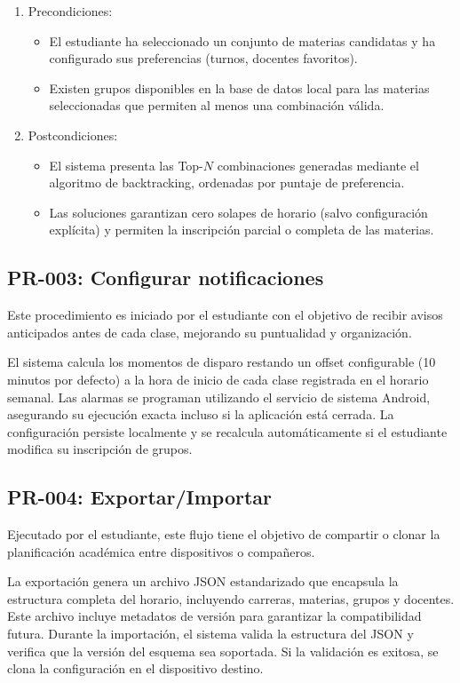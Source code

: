 \begin{enumerate}
  \item Precondiciones:
  \begin{itemize}
    \item El estudiante ha seleccionado un conjunto de materias candidatas y ha configurado sus preferencias (turnos, docentes favoritos).
    \item Existen grupos disponibles en la base de datos local para las materias seleccionadas que permiten al menos una combinación válida.
  \end{itemize}
  \item Postcondiciones:
  \begin{itemize}
    \item El sistema presenta las Top-$N$ combinaciones generadas mediante el algoritmo de backtracking, ordenadas por puntaje de preferencia.
    \item Las soluciones garantizan cero solapes de horario (salvo configuración explícita) y permiten la inscripción parcial o completa de las materias.
  \end{itemize}
\end{enumerate}

\subsection{PR-003: Configurar notificaciones}
Este procedimiento es iniciado por el estudiante con el objetivo de recibir avisos anticipados antes de cada clase, mejorando su puntualidad y organización.

El sistema calcula los momentos de disparo restando un offset configurable (10 minutos por defecto) a la hora de inicio de cada clase registrada en el horario semanal. Las alarmas se programan utilizando el servicio de sistema Android, asegurando su ejecución exacta incluso si la aplicación está cerrada. La configuración persiste localmente y se recalcula automáticamente si el estudiante modifica su inscripción de grupos.

\subsection{PR-004: Exportar/Importar}
Ejecutado por el estudiante, este flujo tiene el objetivo de compartir o clonar la planificación académica entre dispositivos o compañeros.

La exportación genera un archivo JSON estandarizado que encapsula la estructura completa del horario, incluyendo carreras, materias, grupos y docentes. Este archivo incluye metadatos de versión para garantizar la compatibilidad futura. Durante la importación, el sistema valida la estructura del JSON y verifica que la versión del esquema sea soportada. Si la validación es exitosa, se clona la configuración en el dispositivo destino.


